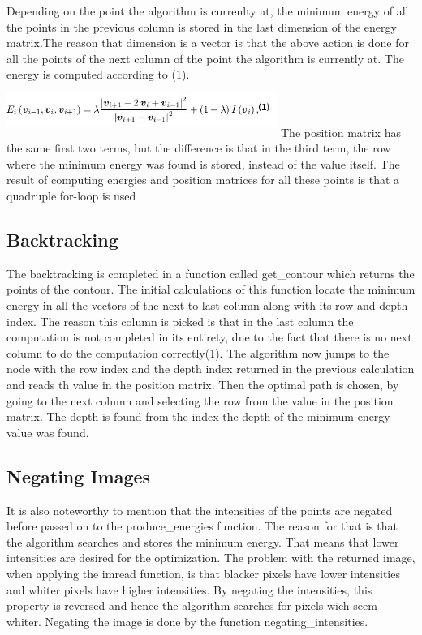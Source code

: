 \documentclass[12pt,a4paper,twocolumn]{article}
\begin{document}
Depending on the point the algorithm is currenlty at, the minimum energy of all the points in the previous column is stored in the last dimension of the energy matrix.The reason that dimension is a vector is that the above action is done for all the points of the next column of the point the algorithm is currently at. The energy is computed according to (1). 
\includegraphics[width=250pt,height=50pt,scale=1]{energy_eq.jpg}
The position matrix has the same first two terms, but the difference is that in the third term, the row where the minimum energy was found is stored, instead of the value itself. The result of computing energies and position matrices for all these points is that a quadruple for-loop is used
\subsection{Backtracking}
The backtracking is completed in a function called get\_contour which returns the points of the contour. The initial calculations of this function locate the minimum energy in all the vectors of the next to last column along with its row and depth index. The reason this column is picked is that in the last column the computation is not completed in its entirety, due to the fact that there is no next column to do the computation correctly(1). The algorithm now jumps to the node with the row index and the depth index returned in the previous calculation and reads th value in the position matrix. Then the optimal path is chosen, by going to the next column and selecting the row from the value in the position matrix. The depth is found from the index the depth of the minimum energy value was found.
\subsection{Negating Images}
It is also noteworthy to mention that the intensities of the points are negated before passed on to the produce\_energies function. The reason for that is that the algorithm searches and stores the minimum energy. That means that lower intensities are desired for the optimization. The problem with the returned image, when applying the imread function, is that blacker pixels have lower intensities and whiter pixels have higher intensities. By negating the intensities, this property is reversed and hence the algorithm searches for pixels wich seem whiter. Negating the image is done by the function negating\_intensities.
\end{document}
